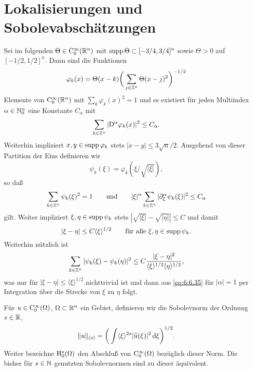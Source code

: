 \section{Lokalisierungen und Sobolevabschätzungen}
Sei im folgenden $\Theta\in\mathrm C_0^\infty(\mathbb R^n)$ mit $\operatorname{supp}\Theta\subset [-3/4,3/4]^n$ sowie $\Theta>0$ auf $[-1/2,1/2]^n$. Dann sind die Funktionen
\begin{equation}
\varphi_k(x) = \Theta(x-k) \bigg(\sum_{j\in\mathbb Z^n} \Theta(x-j)^2\bigg)^{-1/2}
\end{equation}
Elemente von $\mathrm C_0^\infty(\mathbb R^n)$ mit $\sum_{k} \varphi_k(x)^2=1$ und es existiert für jeden Multiindex $\alpha\in\mathbb N_0^n$ eine Konstante $C_\alpha$ mit
\begin{equation}
    \sum_{k\in\mathbb Z^n} | \mathrm D^\alpha \varphi_k(x)|^2 \le C_\alpha.
\end{equation}
Weiterhin impliziert $x,y\in\operatorname{supp}\varphi_k$ stets $|x-y|\le 3\sqrt n/2$. Ausgehend von dieser Partition der Eins definieren wir
\begin{equation}
    \psi_k(\xi)= \varphi_k(\xi / \sqrt{|\xi|}), 
\end{equation}
so daß
\begin{equation}\label{eq:6:6.35} 
    \sum_{k\in\mathbb Z^n} \psi_k(\xi)^2 = 1\qquad\text{und}\qquad |\xi|^\alpha \sum_{k\in\mathbb Z^n} |\partial_\xi^\alpha \psi_k(\xi)|^2 \le C_\alpha
\end{equation}
gilt. Weiter impliziert $\xi,\eta\in\operatorname{supp}\psi_k$ stets $|\sqrt{|\xi|}-\sqrt{|\eta|}|\le C$ und damit 
\begin{equation}
 |\xi-\eta|\le C \langle\xi\rangle^{1/2} \qquad\text{für alle $\xi,\eta\in\operatorname{supp}\psi_k$}.
\end{equation}
Weiterhin nützlich ist
\begin{equation}
  \sum_{k\in\mathbb Z^n} |\psi_k(\xi)-\psi_k(\eta)|^2 \le C \frac{|\xi-\eta|^2}{ \langle\xi\rangle^{1/2} \langle\eta\rangle^{1/2}},
\end{equation} 
was nur für $|\xi-\eta|\le \langle\xi\rangle^{1/2}$ nichttrivial ist und dann aus \eqref{eq:6:6.35} für $|\alpha|=1$ per Integration über die Strecke von $\xi$ zu $\eta$ folgt.

\begin{df}[Sobolevnormen]
Für $u\in\mathrm C_0^\infty(\Omega)$, $\Omega \subset\mathbb R^n$ ein Gebiet, definieren wir die Sobolevnorm der Ordnung $s\in\mathbb R$,
\begin{equation}
     \| u \|_{(s)} = \bigg(\int \langle\xi\rangle^{2s} |\widehat u(\xi)|^2\,\mathrm d\xi\bigg)^{1/2}. 
\end{equation}
Weiter bezeichne $\mathrm H^s_0(\Omega)$ den Abschluß von $\mathrm C_0^\infty(\Omega)$ bezüglich dieser Norm. Die bisher für $s\in\mathbb N$ genutzten Sobolevnormen sind zu dieser äquivalent.
\end{df}


